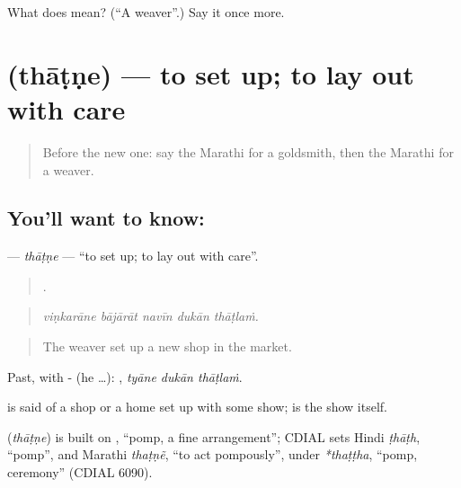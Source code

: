 \begin{tcolorbox}[breakable,colback=teal!4,colframe=teal!35!black,title={Before you move on}]
What does  mean? (\textquotedblleft{}A weaver\textquotedblright{}.) Say it once more.
\end{tcolorbox}
\section[\texorpdfstring{\mr{थाटणे} (thāṭṇe)}{थाटणे (thāṭṇe)}]{ (thāṭṇe) — to set up; to lay out with care}

\label{lesson:MR-C505-thatne}



\begin{quote}
Before the new one: say the Marathi for a goldsmith, then the Marathi for a weaver.
\end{quote}

\subsection*{You'll want to know: }
\textbf{} — \emph{thāṭṇe} — \textquotedblleft{}to set up; to lay out with care\textquotedblright{}.

\begin{quote}
    .
\end{quote}

\begin{quote}
\emph{viṇkarāne bājārāt navīn dukān thāṭlaṁ.}
\end{quote}

\begin{quote}
The weaver set up a new shop in the market.
\end{quote}

Past, with - (he …):   , \emph{tyāne dukān thāṭlaṁ}.

 is said of a shop or a home set up with some show;  is the show itself.

\begin{cousinweb}
\textbf{} (\emph{thāṭṇe}) is built on , \textquotedblleft{}pomp, a fine arrangement\textquotedblright{}; CDIAL sets Hindi \emph{ṭhāṭh}, \textquotedblleft{}pomp\textquotedblright{}, and Marathi \emph{thaṭṇẽ}, \textquotedblleft{}to act pompously\textquotedblright{}, under \emph{*thaṭṭha}, \textquotedblleft{}pomp, ceremony\textquotedblright{} (CDIAL 6090).
\end{cousinweb}

